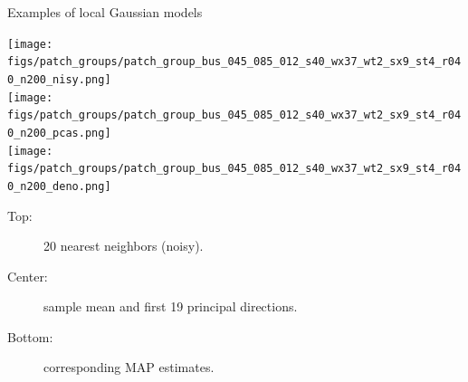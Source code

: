 \documentclass[mathserif, 8pt]{beamer}
\begin{document}
\begin{frame}{Examples of local Gaussian models}
	\begin{center}
	\texttt{[image: figs/patch\_groups/patch\_group\_bus\_045\_085\_012\_s40\_wx37\_wt2\_sx9\_st4\_r040\_n200\_nisy.png]}\\
	\vspace{.2cm}
	\texttt{[image: figs/patch\_groups/patch\_group\_bus\_045\_085\_012\_s40\_wx37\_wt2\_sx9\_st4\_r040\_n200\_pcas.png]}\\
	\vspace{.2cm}
	\texttt{[image: figs/patch\_groups/patch\_group\_bus\_045\_085\_012\_s40\_wx37\_wt2\_sx9\_st4\_r040\_n200\_deno.png]}\\
	\end{center}

	\medskip

	\begin{description}
		\item[Top:] 20 nearest neighbors (noisy).

		\item[Center:] sample mean and first 19 principal directions.

		\item[Bottom:] corresponding MAP estimates.
	\end{description}

\end{frame}
\end{document}
